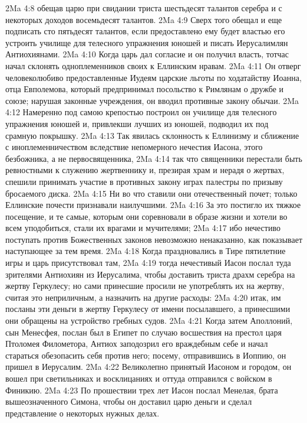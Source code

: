 \vs 2Ma 4:8 обещав царю при свидании триста шестьдесят талантов серебра и с некоторых доходов восемьдесят талантов.
\vs 2Ma 4:9 Сверх того обещал и еще подписать сто пятьдесят талантов, если предоставлено ему будет властью его устроить училище для телесного упражнения юношей и писать Иерусалимлян Антиохиянами.
\vs 2Ma 4:10 Когда царь дал согласие и он получил власть, тотчас начал склонять одноплеменников своих к Еллинским нравам.
\vs 2Ma 4:11 Он отверг человеколюбиво предоставленные Иудеям царские льготы по ходатайству Иоанна, отца Евполемова, который предпринимал посольство к Римлянам о дружбе и союзе; нарушая законные учреждения, он вводил противные закону обычаи.
\vs 2Ma 4:12 Намеренно под самою крепостью построил он училище для телесного упражнения юношей и, привлекши лучших из юношей, подводил их под срамную покрышку.
\vs 2Ma 4:13 Так явилась склонность к Еллинизму и сближение с иноплеменничеством вследствие непомерного нечестия Иасона, этого безбожника, а не первосвященника,
\vs 2Ma 4:14 так что священники перестали быть ревностными к служению жертвеннику и, презирая храм и нерадя о жертвах, спешили принимать участие в противных закону играх палестры по призыву бросаемого диска.
\vs 2Ma 4:15 Ни во что ставили они отечественный почет; только Еллинские почести признавали наилучшими.
\vs 2Ma 4:16 За это постигло их тяжкое посещение, и те самые, которым они соревновали в образе жизни и хотели во всем уподобиться, стали их врагами и мучителями;
\vs 2Ma 4:17 ибо нечестиво поступать против Божественных законов невозможно ненаказанно, как показывает наступающее за тем время.
\vs 2Ma 4:18 Когда праздновались в Тире пятилетние игры и царь присутствовал там,
\vs 2Ma 4:19 тогда нечестивый Иасон послал туда зрителями Антиохиян из Иерусалима, чтобы доставить триста драхм серебра на жертву Геркулесу; но сами принесшие просили не употреблять их на жертву, считая это неприличным, а назначить на другие расходы:
\vs 2Ma 4:20 итак, им посланы эти деньги в жертву Геркулесу от имени посылавшего, а принесшими они обращены на устройство гребных судов.
\vs 2Ma 4:21 Когда затем Аполлоний, сын Менесфея, послан был в Египет по случаю восшествия на престол царя Птоломея Филометора, Антиох заподозрил его враждебным себе и начал стараться обезопасить себя против него; посему, отправившись в Иоппию, он пришел в Иерусалим.
\vs 2Ma 4:22 Великолепно принятый Иасоном и городом, он вошел при светильниках и восклицаниях и оттуда отправился с войском в Финикию.
\vs 2Ma 4:23 По прошествии трех лет Иасон послал Менелая, брата вышеозначенного Симона, чтобы он доставил царю деньги и сделал представление о некоторых нужных делах.

